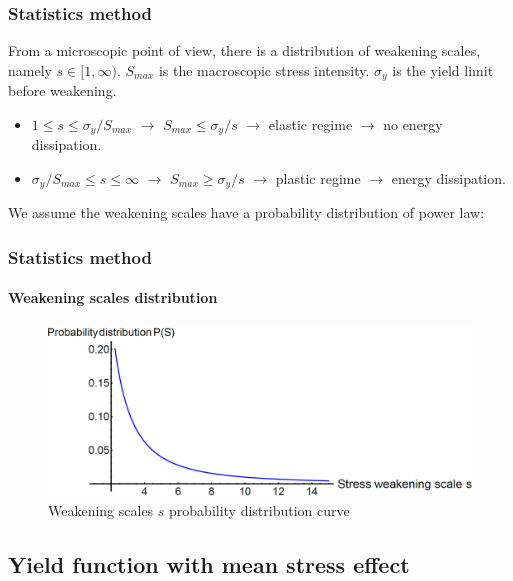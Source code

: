 \documentclass[xcolor=table]{Bredelebeamer}
\begin{document}
\begin{frame}
	\frametitle{Statistics method}	
From a microscopic point of view, there is a distribution of weakening scales, namely $s\in[1,\infty)$. $S_{max}$ is the macroscopic stress intensity. $\sigma_y$ is the yield limit before weakening.
	
	\vspace{6pt}
	\begin{itemize}	
\item	$1\leqslant s\leqslant \sigma_y/S_{max}$ $\longrightarrow$ $S_{max}\leqslant \sigma_y/s$ $\longrightarrow$ elastic regime $\longrightarrow$ no energy dissipation.

\vspace{6pt}		
\item	$\sigma_y/S_{max}\leqslant s\leqslant \infty$ $\longrightarrow$ $S_{max}\geqslant \sigma_y/s$ $\longrightarrow$ plastic regime $\longrightarrow$  energy dissipation.
\end{itemize}
	\vspace{6pt}
	We assume the weakening scales have a probability distribution of power law: 
	
\end{frame}	



\begin{frame}
	\frametitle{Statistics method}	
	\framesubtitle{Weakening scales distribution}	
	
	\begin{figure}[h!]
		\centering
		\includegraphics[width=\textwidth]{figures//ps.png} 
		\caption{Weakening scales $s$ probability distribution curve}
		\label{ps}
	\end{figure}
\end{frame}	

\subsection{Yield function with mean stress effect}
\end{document}
